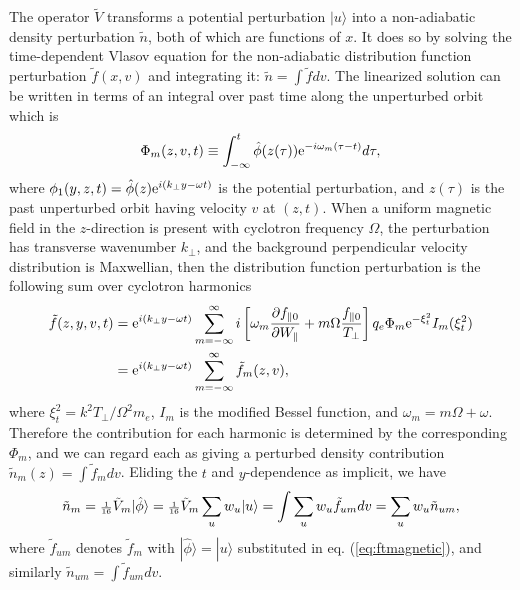 \documentclass[12pt]{article}
\def\ket#1{|#1\rangle}
\begin{document}
The operator $\tilde{V}$ transforms a potential perturbation $\ket{u}$ into
a non-adiabatic density perturbation $\tilde n$, both of which are
functions of $x$. It does so by solving the time-dependent Vlasov
equation for the non-adiabatic distribution function perturbation
$\tilde f(x,v)$ and integrating it: $\tilde n =\int \tilde f dv$. The
linearized solution can be written in terms of an integral over past
time along the unperturbed orbit which is
\begin{equation}
  \label{eq:phim}
  \Phi_m(z,v,t)\equiv 
  \int_{-\infty}^t \hat\phi(z(\tau)){\rm e}^{-i\omega_m(\tau-t)}d\tau,
\end{equation}
where $\phi_1(y,z,t)=\hat\phi(z){\rm e}^{i(k_\perp y-\omega t)}$ is the potential
perturbation, and $z(\tau)$ is the past unperturbed orbit having
velocity $v$ at $(z,t)$. When a uniform magnetic field in the
$z$-direction is present with cyclotron frequency $\Omega$, the
perturbation has transverse wavenumber $k_\perp$, and the background
perpendicular velocity distribution is Maxwellian, then the
distribution function perturbation is the following sum over cyclotron
harmonics
\begin{equation}\label{eq:ftmagnetic}
  \begin{split}
    \tilde f(z,y,v,t) &=  {\rm e}^{i(k_\perp y-\omega t)}
 \sum_{m=-\infty}^\infty i\left[\omega_m
  {\partial f_{\parallel0}\over \partial W_\parallel}
  +m\Omega {f_{\parallel0}\over T_\perp}\right]
  q_e\Phi_m {\rm e}^{-\xi_t^2}I_m(\xi_t^2)\\
  &= {\rm e}^{i(k_\perp y-\omega t)} \sum_{m=-\infty}^\infty \tilde f_m(z,v),
  \end{split}
\end{equation}
where $\xi_t^2=k^2T_\perp/\Omega^2m_e$, $I_m$ is the modified Bessel
function, and $\omega_m=m\Omega+\omega$. Therefore the contribution
for each harmonic is determined by the corresponding $\Phi_m$, and we
can regard each as giving a perturbed density contribution
$\tilde n_m(z)=\int \tilde f_m dv$. Eliding the $t$ and $y$-dependence
as implicit, we have
\begin{equation}
  \label{eq:13}
\tilde  n_m={\scriptstyle {1\over16}}\tilde{V}_{m}\ket{\hat\phi}={\scriptstyle{1\over16}}\tilde{V}_{m}\sum_u w_u\ket{u}=\int \sum_u w_u
  \tilde f_{um} dv=\sum_u w_u \tilde n_{um},
\end{equation}
where $\tilde f_{um}$ denotes $\tilde f_m$ with
$\ket{\hat\phi}=\ket{u}$ substituted in eq. (\ref{eq:ftmagnetic}), and
similarly $\tilde n_{um}=\int \tilde f_{um}dv$.
\end{document}
